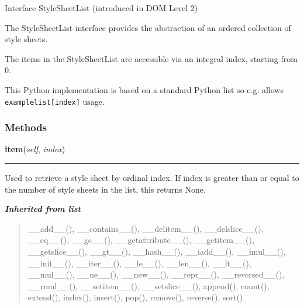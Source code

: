 Interface StyleSheetList (introduced in DOM Level 2)

The StyleSheetList interface provides the abstraction of an ordered
collection of style sheets.

The items in the StyleSheetList are accessible via an integral index,
starting from 0.

This Python implementation is based on a standard Python list so e.g.
allows \texttt{examplelist{[}index{]}} usage.


  \subsubsection{Methods}

    \label{cssutils:stylesheets:stylesheetlist:StyleSheetList:item}

    \vspace{0.5ex}

\hspace{.8\funcindent}\begin{boxedminipage}{\funcwidth}

    \raggedright \textbf{item}(\textit{self}, \textit{index})

    \vspace{-1.5ex}

    \rule{\textwidth}{0.5\fboxrule}
\setlength{\parskip}{2ex}

Used to retrieve a style sheet by ordinal index. If index is
greater than or equal to the number of style sheets in the list,
this returns None.
\setlength{\parskip}{1ex}
    \end{boxedminipage}


\large{\textbf{\textit{Inherited from list}}}

\begin{quote}
\_\_add\_\_(), \_\_contains\_\_(), \_\_delitem\_\_(), \_\_delslice\_\_(), \_\_eq\_\_(), \_\_ge\_\_(), \_\_getattribute\_\_(), \_\_getitem\_\_(), \_\_getslice\_\_(), \_\_gt\_\_(), \_\_hash\_\_(), \_\_iadd\_\_(), \_\_imul\_\_(), \_\_init\_\_(), \_\_iter\_\_(), \_\_le\_\_(), \_\_len\_\_(), \_\_lt\_\_(), \_\_mul\_\_(), \_\_ne\_\_(), \_\_new\_\_(), \_\_repr\_\_(), \_\_reversed\_\_(), \_\_rmul\_\_(), \_\_setitem\_\_(), \_\_setslice\_\_(), append(), count(), extend(), index(), insert(), pop(), remove(), reverse(), sort()
\end{quote}

